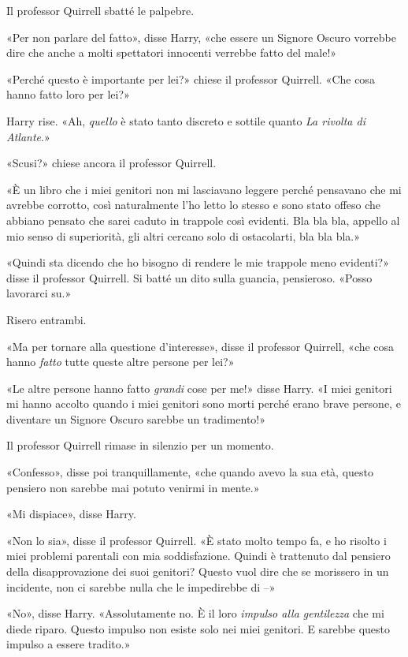Il professor Quirrell sbatté le palpebre.

«Per non parlare del fatto», disse Harry, «che essere un Signore Oscuro vorrebbe dire che anche a molti spettatori innocenti verrebbe fatto del male!»

«Perché questo è importante per lei?» chiese il professor Quirrell. «Che cosa hanno fatto loro per lei?»

Harry rise. «Ah, \textit{quello} è stato tanto discreto e sottile quanto \textit{La rivolta di Atlante}.»

«Scusi?» chiese ancora il professor Quirrell.

«È un libro che i miei genitori non mi lasciavano leggere perché pensavano che mi avrebbe corrotto, così naturalmente l’ho letto lo stesso e sono stato offeso che abbiano pensato che sarei caduto in trappole così evidenti. Bla bla bla, appello al mio senso di superiorità, gli altri cercano solo di ostacolarti, bla bla bla.»

«Quindi sta dicendo che ho bisogno di rendere le mie trappole meno evidenti?» disse il professor Quirrell. Si batté un dito sulla guancia, pensieroso. «Posso lavorarci su.»

Risero entrambi.

«Ma per tornare alla questione d’interesse», disse il professor Quirrell, «che cosa hanno \textit{fatto} tutte queste altre persone per lei?»

«Le altre persone hanno fatto \textit{grandi} cose per me!» disse Harry. «I miei genitori mi hanno accolto quando i miei genitori sono morti perché erano brave persone, e diventare un Signore Oscuro sarebbe un tradimento!»

Il professor Quirrell rimase in silenzio per un momento.

«Confesso», disse poi tranquillamente, «che quando avevo la sua età, questo pensiero non sarebbe mai potuto venirmi in mente.»

«Mi dispiace», disse Harry.

«Non lo sia», disse il professor Quirrell. «È stato molto tempo fa, e ho risolto i miei problemi parentali con mia soddisfazione. Quindi è trattenuto dal pensiero della disapprovazione dei suoi genitori? Questo vuol dire che se morissero in un incidente, non ci sarebbe nulla che le impedirebbe di –»

«No», disse Harry. «Assolutamente no. È il loro \textit{impulso alla gentilezza} che mi diede riparo. Questo impulso non esiste solo nei miei genitori. E sarebbe questo impulso a essere tradito.»

